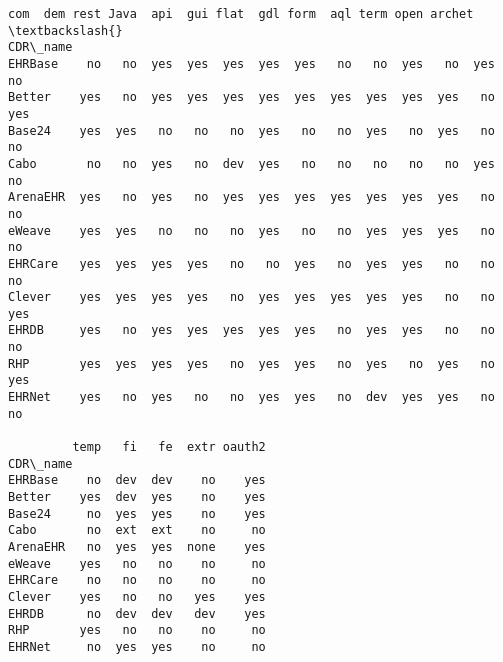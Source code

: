 \documentclass[11pt]{article}
\makeatletter
\newcommand{\boxspacing}{\kern\kvtcb@left@rule\kern\kvtcb@boxsep}
\newcommand{\prompt}[4]{
        \ttfamily\llap{{\color{#2}[#3]:\hspace{3pt}#4}}\vspace{-\baselineskip}
    }
\makeatother
\begin{document}
            \begin{tcolorbox}[breakable, size=fbox, boxrule=.5pt, pad at break*=1mm, opacityfill=0]
\prompt{Out}{outcolor}{564}{\boxspacing}
\begin{Verbatim}[commandchars=\\\{\}]
          com  dem rest Java  api  gui flat  gdl form  aql term open archet  \textbackslash{}
CDR\_name
EHRBase    no   no  yes  yes  yes  yes  yes   no   no  yes   no  yes     no
Better    yes   no  yes  yes  yes  yes  yes  yes  yes  yes  yes   no    yes
Base24    yes  yes   no   no   no  yes   no   no  yes   no  yes   no     no
Cabo       no   no  yes   no  dev  yes   no   no   no   no   no  yes     no
ArenaEHR  yes   no  yes   no  yes  yes  yes  yes  yes  yes  yes   no     no
eWeave    yes  yes   no   no   no  yes   no   no  yes  yes  yes   no     no
EHRCare   yes  yes  yes  yes   no   no  yes   no  yes  yes   no   no     no
Clever    yes  yes  yes  yes   no  yes  yes  yes  yes  yes   no   no    yes
EHRDB     yes   no  yes  yes  yes  yes  yes   no  yes  yes   no   no     no
RHP       yes  yes  yes  yes   no  yes  yes   no  yes   no  yes   no    yes
EHRNet    yes   no  yes   no   no  yes  yes   no  dev  yes  yes   no     no

         temp   fi   fe  extr oauth2
CDR\_name
EHRBase    no  dev  dev    no    yes
Better    yes  dev  yes    no    yes
Base24     no  yes  yes    no    yes
Cabo       no  ext  ext    no     no
ArenaEHR   no  yes  yes  none    yes
eWeave    yes   no   no    no     no
EHRCare    no   no   no    no     no
Clever    yes   no   no   yes    yes
EHRDB      no  dev  dev   dev    yes
RHP       yes   no   no    no     no
EHRNet     no  yes  yes    no     no
\end{Verbatim}
\end{tcolorbox}
        
\end{document}
